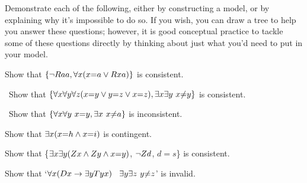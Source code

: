 \solutions
\problempart Demonstrate each of the following, either by constructing a model, or by explaining why it's impossible to do so. If you wish, you can draw a tree to help you answer these questions; however, it is good conceptual practice to tackle some of these questions directly by thinking about just what you'd need to put in your model.
\label{pr.IdentityModels}
\begin{earg}
\item Show that $\{{\neg}Raa, \forall x (x{=}a \vee Rxa)\}$
is consistent.
\item\ Show that $\{\forall x\forall y\forall z(x{=}y \vee y{=}z \vee x{=}z),
\exists x\exists y\ x{\neq} y\}$ is consistent.
\item\ Show that $\{\forall x\forall y\ x{=}y, \exists x\ x {\neq} a\}$ is inconsistent.
\item Show that $\exists x (x {=} h \wedge x {=} i)$ is contingent.
\item Show that \{$\exists x\exists y(Zx \wedge Zy \wedge x{=}y)$, $\neg Zd$, $d{=}s$\} is consistent.
\item Show that `$\forall x(Dx \rightarrow \exists y Tyx)$ \therefore\ $\exists y \exists z\ y{\neq} z$' is invalid.
\end{earg}

